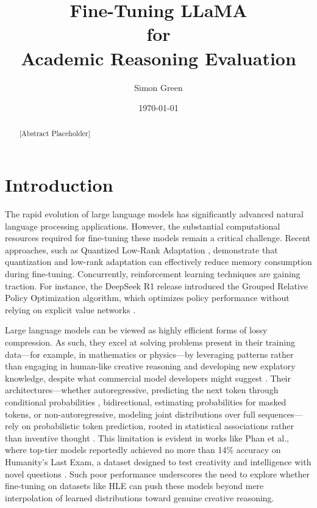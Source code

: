 \documentclass{svproc}
\title{Fine-Tuning LLaMA \\for \\Academic Reasoning Evaluation}
\author{Simon Green\inst{1}}
\institute{
    School of Computing, University of Leeds, UK \\
    \inst{1} MSc, Artificial Intelligence \\
    \email{\{od21sg\}@leeds.ac.uk}
}
\date{\today}
\begin{document}
\maketitle


\begin{abstract}
  [Abstract Placeholder]
\end{abstract}


\section{Introduction}

The rapid evolution of large language models has significantly advanced natural language processing applications. However, the substantial computational resources required for fine-tuning these models remain a critical challenge. Recent approaches, such as Quantized Low-Rank Adaptation \cite{dettmers2023qloraefficientfinetuningquantized}, demonstrate that quantization and low-rank adaptation can effectively reduce memory consumption during fine-tuning. Concurrently, reinforcement learning techniques are gaining traction. For instance, the DeepSeek R1 release introduced the Grouped Relative Policy Optimization algorithm, which optimizes policy performance without relying on explicit value networks \cite{shao2024deepseekmathpushinglimitsmathematical, schulman2017proximalpolicyoptimizationalgorithms}.

Large language models can be viewed as highly efficient forms of lossy compression. As such, they excel at solving problems present in their training data—for example, in mathematics or physics—by leveraging patterns rather than engaging in human-like creative reasoning and developing new explatory knowledge, despite what commercial model developers might suggest \cite{deutsch2011beginning}. Their architectures—whether autoregressive, predicting the next token through conditional probabilities \cite{vaswani2023attentionneed}, bidirectional, estimating probabilities for masked tokens, or non-autoregressive, modeling joint distributions over full sequences—rely on probabilistic token prediction, rooted in statistical associations rather than inventive thought \cite{gu2018nonautoregressiveneuralmachinetranslation, lee2018deterministicnonautoregressiveneuralsequence}. This limitation is evident in works like Phan et al., where top-tier models reportedly achieved no more than 14\% accuracy on Humanity’s Last Exam, a dataset designed to test creativity and intelligence with novel questions \cite{phan2025humanitysexam}. Such poor performance underscores the need to explore whether fine-tuning on datasets like HLE can push these models beyond mere interpolation of learned distributions toward genuine creative reasoning.
\end{document}
